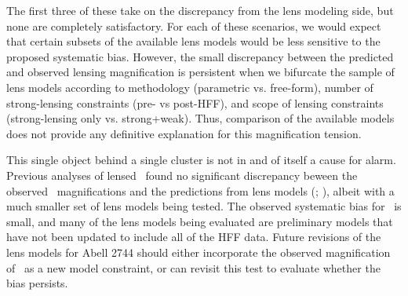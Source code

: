 \noindent The first three of these take on the discrepancy from 
the lens modeling side, but none are completely satisfactory. For each
of these scenarios, we would expect that certain subsets of the
available lens models would be less sensitive to the proposed
systematic bias.  However, the small discrepancy between the predicted
and observed lensing magnification is persistent when we bifurcate the
sample of lens models according to methodology (parametric
vs. free-form), number of strong-lensing constraints (pre- vs
post-HFF), and scope of lensing constraints (strong-lensing only
vs. strong+weak). Thus, comparison of the available models does not
provide any definitive explanation for this magnification tension.




This single object behind a single cluster is not in and of itself a
cause for alarm.  Previous analyses of lensed \SNIa\ found no
significant discrepancy beween the observed \SNIa\ magnifications and
the predictions from lens models
(; \citealt{Nordin:2014}), albeit with a much
smaller set of lens models being tested.  The observed systematic bias
for \tomas\ is small, and many of the lens models being evaluated are
preliminary models that have not been updated to include all of the
HFF data.  Future revisions of the lens models for Abell 2744 should
either incorporate the observed magnification of \tomas\ as a new
model constraint, or can revisit this test to evaluate whether the
bias persists.

